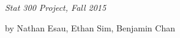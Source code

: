 \begin{titlepage}
\newcommand{\HRule}{\rule{\linewidth}{0.5mm}} 

\center %


\mbox{ }
\vspace{75mm}

{ \Huge \bfseries \color{black}{Analysis of whistler weather data}}\\[0.4cm] 

{\Large
\textsl{Stat 300 Project, Fall 2015}}

\bigskip
{\Large
by Nathan Esau, Ethan Sim, Benjamin Chan}

\vfill



\end{titlepage}